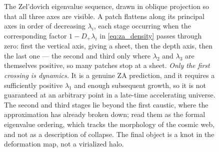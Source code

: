 \documentclass[a4paper,11pt]{article}
\numberwithin{equation}{section}
\begin{document}
\begin{figure}[t]
\centering
{}
\caption{The Zel'dovich eigenvalue sequence, drawn in oblique projection so that all three axes are visible. A patch flattens along its principal axes in order of decreasing $\lambda_i$, each stage occurring when the corresponding factor $1-D_+\lambda_i$ in \eqref{eq:za_density} passes through zero: first the vertical axis, giving a sheet, then the depth axis, then the last one --- the second and third only where $\lambda_2$ and $\lambda_3$ are themselves positive, so many patches stop at a sheet. \emph{Only the first crossing is dynamics.} It is a genuine ZA prediction, and it requires a sufficiently positive $\lambda_1$ and enough subsequent growth, so it is not guaranteed at an arbitrary point in a late-time accelerating universe. The second and third stages lie beyond the first caustic, where the approximation has already broken down; read them as the formal eigenvalue ordering, which tracks the morphology of the cosmic web, and not as a description of collapse. The final object is a knot in the deformation map, not a virialized halo.}
\label{fig:collapse}
\end{figure}
\end{document}
